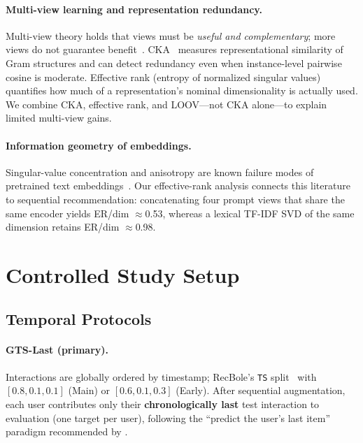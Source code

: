 \documentclass[sigconf,natbib=true,anonymous]{acmart}
\newcommand{\tfidf}{\textsc{TF-IDF}\xspace}
\begin{document}
\paragraph{Multi-view learning and representation redundancy.}
Multi-view theory holds that views must be \emph{useful and complementary}; more views do not guarantee benefit~\cite{xu2013multiview}.
CKA~\cite{kornblith2019cka} measures representational similarity of Gram structures and can detect redundancy even when instance-level pairwise cosine is moderate.
Effective rank (entropy of normalized singular values) quantifies how much of a representation's nominal dimensionality is actually used.
We combine CKA, effective rank, and LOOV---not CKA alone---to explain limited multi-view gains.

\paragraph{Information geometry of embeddings.}
Singular-value concentration and anisotropy are known failure modes of pretrained text embeddings~\cite{ethayarajh2019contextual}.
Our effective-rank analysis connects this literature to sequential recommendation: concatenating four prompt views that share the same encoder yields ER/dim $\approx$0.53, whereas a lexical \tfidf SVD of the same dimension retains ER/dim $\approx$0.98.

\section{Controlled Study Setup}
\label{sec:setup}

\subsection{Temporal Protocols}
\label{sec:protocol}

\paragraph{GTS-Last (primary).}
Interactions are globally ordered by timestamp; RecBole's \texttt{TS} split~\cite{zhao2021recbole} with $[0.8,0.1,0.1]$ (Main) or $[0.6,0.1,0.3]$ (Early).
After sequential augmentation, each user contributes only their \textbf{chronologically last} test interaction to evaluation (one target per user), following the ``predict the user's last item'' paradigm recommended by \citet{liang2024timetosplit}.
\end{document}
